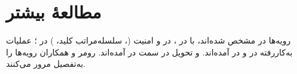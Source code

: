 \documentclass[11pt,a4paper]{article}
\begin{document}
\section{مطالعهٔ بیشتر}
رویه‌ها در  \cite{ts23502} مشخص شده‌اند، با  در  \cite{ts24501}،  در
 \cite{ts38413} و امنیت (، سلسله‌مراتب کلید، ) در  \cite{ts33501}؛ عملیات
 به‌کاررفته در  \cite{ts29500} و  در  \cite{ts29510} آمده‌اند.  و
تحویل در سمت  در  \cite{ts38300} آمده‌اند. رومر و همکاران \cite{rommer2020core} رویه‌ها را به‌تفصیل مرور
می‌کنند.

\begin{latin}
\printbibliography[heading=subbibliography,title={References}]
\end{latin}
\end{document}
